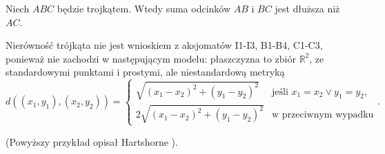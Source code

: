 %

\begin{proposition}
	Niech $ABC$ będzie trojkątem.
	Wtedy suma odcinków $AB$ i $BC$ jest dłuższa niż $AC$.
\end{proposition} %

Nierówność trójkąta nie jest wnioskiem z aksjomatów I1-I3, B1-B4, C1-C3, ponieważ nie zachodzi w następującym modelu: płaszczyzna to zbiór $\mathbb R^2$, ze standardowymi punktami i prostymi, ale niestandardową metryką
\begin{equation}
	d((x_1, y_1), (x_2, y_2)) = \begin{cases}
		\sqrt{(x_1-x_2)^2 + (y_1-y_2)^2} & \text{jeśli } x_1 = x_2 \vee y_1 = y_2, \\
		2 \sqrt{(x_1-x_2)^2 + (y_1-y_2)^2} & \text{w przeciwnym wypadku}
	\end{cases}.
\end{equation}

(Powyższy przykład opisał Hartshorne \cite[s. 90]{hartshorne2000}).

%